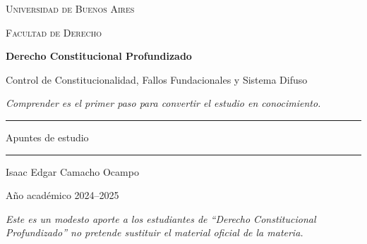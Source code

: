 \documentclass[12pt,oneside,a4paper]{book}
\newcommand{\universidad}{Universidad de Buenos Aires}
\newcommand{\facultad}{Facultad de Derecho}
\newcommand{\materia}{Derecho Constitucional Profundizado}
\newcommand{\titulo}{Control de Constitucionalidad, Fallos Fundacionales y Sistema Difuso}
\newcommand{\autor}{Isaac Edgar Camacho Ocampo}
\newcommand{\anio}{Año académico 2024--2025}
\begin{document}

\begin{titlepage}

\thispagestyle{empty}

\begin{center}

\vspace*{1cm}

{\large \textsc{\universidad}}

\vspace{0.2cm}

{\large \textsc{\facultad}}

\vspace{3cm}

{\Huge \textbf{\materia}}

\vspace{1cm}

{\LARGE \titulo}

\vspace{0.8cm}

\textit{Comprender es el primer paso para convertir el estudio en conocimiento.}

\vspace{1.2cm}

\rule{0.70\textwidth}{0.5pt}

\vspace{0.5cm}

{\large Apuntes de estudio}

\vspace{0.5cm}

\rule{0.70\textwidth}{0.5pt}

\vfill

{\large \autor}

\vspace{0.3cm}

{\large \anio}

\end{center}

\vfill

\begin{flushleft}
\textit{Este es un modesto aporte a los estudiantes de ``\materia'' no pretende sustituir el material oficial de la materia.}
\end{flushleft}

\end{titlepage}
\end{document}
